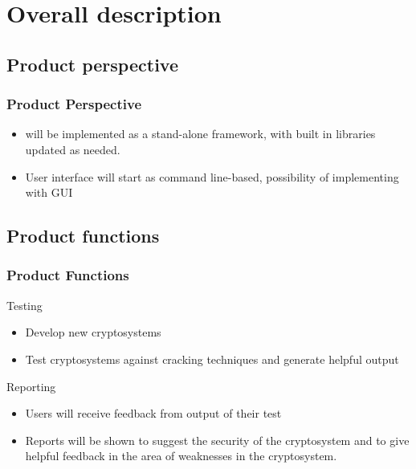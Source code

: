
\section{Overall description}


\subsection{Product perspective}

\begin{frame} %
\frametitle{Product Perspective}
\begin{itemize}
  \item \cry{} will be implemented as a stand-alone framework, with built in libraries updated as needed.
  \item User interface will start as command line-based, possibility of implementing with GUI
\end{itemize}
\end{frame}


\subsection{Product functions}
\begin{frame}
\frametitle{Product Functions}
Testing
\begin{itemize}
  \item Develop new cryptosystems
  \item Test cryptosystems against cracking techniques and generate helpful output
\end{itemize}
Reporting
\begin{itemize}
  \item Users will receive feedback from output of their test
  \item Reports will be shown to suggest the security of the cryptosystem and to give helpful feedback
    in the area of weaknesses in the cryptosystem.
\end{itemize}
\end{frame}

